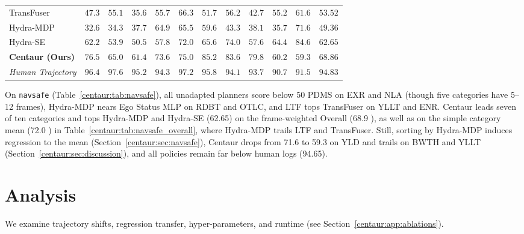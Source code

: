 \begin{table}[tbp]
\begin{adjustbox}{max width=\textwidth}
\begin{tabular}{l|rrrrrrrrrr|r}
    TransFuser~\cite{chitta2023transfuser} & $47.3$ & $55.1$ & $35.6$ & $55.7$ & $66.3$ & $51.7$ & $56.2$ & $42.7$ & $55.2$ & $61.6$ & $53.52$ \\
    Hydra-MDP~\cite{li2024hydramdp} & $32.6$ & $34.3$ & $37.7$ & $64.9$ & $65.5$ & $59.6$ & $43.3$ & $38.1$ & $35.7$ & $71.6$ & $49.36$ \\
    \midrule
    Hydra-SE & $62.2$ & $53.9$ & $50.5$ & $57.8$ & $72.0$ & $65.6$ & $74.0$ & $57.6$ & $\mathbf{64.4}$ & $\mathbf{84.6}$ & $62.65$ \\
    \textbf{Centaur (Ours)} & $\mathbf{76.5}$ & $65.0$ & $\mathbf{61.4}$ & $\mathbf{73.6}$ & $\mathbf{75.0}$ & $\mathbf{85.2}$ & $\mathbf{83.6}$ & $\mathbf{79.8}$ & $60.2$ & $59.3$ & $\mathbf{68.86}$ \\
    \midrule
    \textit{Human Trajectory} & $\mathit{96.4}$ & $\mathit{97.6}$ & $\mathit{95.2}$ & $\mathit{94.3}$ & $\mathit{97.2}$ & $\mathit{95.8}$ & $\mathit{94.1}$ & $\mathit{93.7}$ & $\mathit{90.7}$ & $\mathit{91.5}$ & $\mathit{94.83}$ \\
    \bottomrule
  \end{tabular}
  \end{adjustbox}
\end{table}

On \texttt{navsafe} (Table~\ref{centaur:tab:navsafe}), all unadapted planners score below 50 PDMS on EXR and NLA (though five categories have 5--12 frames), Hydra-MDP nears Ego Status MLP on RDBT and OTLC, and LTF tops TransFuser on YLLT and ENR. Centaur leads seven of ten categories and tops Hydra-MDP and Hydra-SE (62.65) on the frame-weighted Overall (68.9 ), as well as on the simple category mean (72.0 ) in Table~\ref{centaur:tab:navsafe_overall}, where Hydra-MDP trails LTF and TransFuser. Still, sorting by Hydra-MDP induces regression to the mean (Section~\ref{centaur:sec:navsafe}), Centaur drops from 71.6 to 59.3 on YLD and trails on BWTH and YLLT (Section~\ref{centaur:sec:discussion}), and all policies remain far below human logs (94.65).

\section{Analysis}\label{centaur:sec:analysis}

We examine trajectory shifts, regression transfer, hyper-parameters, and runtime (see Section~\ref{centaur:app:ablations}).

